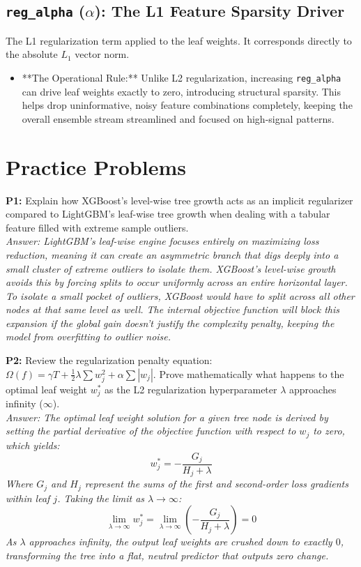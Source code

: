 \documentclass{article}
\begin{document}
\subsection{\texttt{reg\_alpha} ($\alpha$): The L1 Feature Sparsity Driver}
The L1 regularization term applied to the leaf weights. It corresponds directly to the absolute $L_1$ vector norm.
\begin{itemize}
    \item **The Operational Rule:** Unlike L2 regularization, increasing \texttt{reg\_alpha} can drive leaf weights exactly to zero, introducing structural sparsity. This helps drop uninformative, noisy feature combinations completely, keeping the overall ensemble stream streamlined and focused on high-signal patterns.
\end{itemize}

\newpage
\section{Practice Problems}

\textbf{P1:} Explain how XGBoost's level-wise tree growth acts as an implicit regularizer compared to LightGBM's leaf-wise tree growth when dealing with a tabular feature filled with extreme sample outliers.
\\
\textit{Answer: LightGBM's leaf-wise engine focuses entirely on maximizing loss reduction, meaning it can create an asymmetric branch that digs deeply into a small cluster of extreme outliers to isolate them. XGBoost's level-wise growth avoids this by forcing splits to occur uniformly across an entire horizontal layer. To isolate a small pocket of outliers, XGBoost would have to split across all other nodes at that same level as well. The internal objective function will block this expansion if the global gain doesn't justify the complexity penalty, keeping the model from overfitting to outlier noise.}

\newline
\textbf{P2:} Review the regularization penalty equation: $\Omega(f) = \gamma T + \frac{1}{2}\lambda \sum w_j^2 + \alpha \sum |w_j|$. Prove mathematically what happens to the optimal leaf weight $w_j^*$ as the L2 regularization hyperparameter $\lambda$ approaches infinity ($\infty$).
\\
\textit{Answer: The optimal leaf weight solution for a given tree node is derived by setting the partial derivative of the objective function with respect to $w_j$ to zero, which yields:
\begin{equation*}
    w_j^* = -\frac{G_j}{H_j + \lambda}
\end{equation*}
Where $G_j$ and $H_j$ represent the sums of the first and second-order loss gradients within leaf $j$. Taking the limit as $\lambda \to \infty$:
\begin{equation*}
    \lim_{\lambda \to \infty} w_j^* = \lim_{\lambda \to \infty} \left( -\frac{G_j}{H_j + \lambda} \right) = 0
\end{equation*}
As $\lambda$ approaches infinity, the output leaf weights are crushed down to exactly $0$, transforming the tree into a flat, neutral predictor that outputs zero change.}
\end{document}

